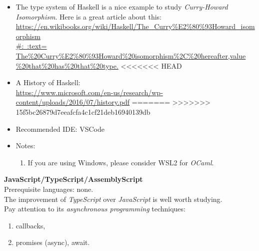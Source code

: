 \documentclass{article}
\begin{document}
\begin{itemize}
\begin{itemize}
        \end{itemize}
        \item The type system of Haskell is a nice example to study \emph{Curry-Howard Isomorphism}. Here is a great article about this:\\
        \href{https://en.wikibooks.org/wiki/Haskell/The_Curry%E2%80%93Howard_isomorphism#:~:text=The%20Curry%E2%80%93Howard%20isomorphism%2C%20hereafter,value%20that%20has%20that%20type.}{https://en.wikibooks.org/wiki/Haskell/The\_Curry\%E2\%80\%93Howard\_isomorphism\\
        #:~:text=  The\%20Curry\%E2\%80\%93Howard\%20isomorphism\%2C\%20hereafter,value\\
        \%20that\%20has\%20that\%20type.}
<<<<<<< HEAD
        \item A History of Haskell:\\
        \href{https://www.microsoft.com/en-us/research/wp-content/uploads/2016/07/history.pdf}{https://www.microsoft.com/en-us/research/wp-content/uploads/2016/07/history.pdf}
=======
>>>>>>> 15f5bc26879d7eeafcfa4c1cf21deb16940139db
        
        \item Recommended IDE: VSCode
        \item Notes:
            \begin{enumerate}
                \item If you are using Windows, please consider WSL2 for \emph{OCaml}.
            \end{enumerate}
    \end{itemize}    
    \item \textbf{JavaScript/TypeScript/AssemblyScript}\\
    Prerequisite languages: none.\\
    The improvement of \emph{TypeScript} over \emph{JavaScript} is well worth studying.\\
    Pay attention to its \emph{asynchronous programming} techniques:
    \begin{enumerate}
        \item callbacks,
        \item promises (async), await.
    \end{enumerate}
\end{document}

